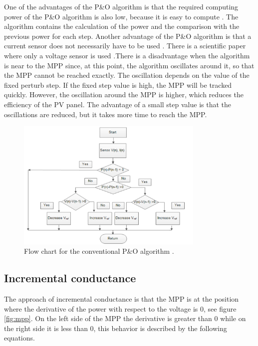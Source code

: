 One of the advantages of the P\&O algorithm is that the required computing power of the P\&O algorithm is also low, because it is easy to compute . The algorithm contains the calculation of the power and the comparison with the previous power for each step. Another advantage of the P\&O algorithm is that a current sensor does not necessarily have to be used  . There is a scientific paper where only a voltage sensor is used \cite{withoutcurrent}.There is a disadvantage when the algorithm is near to the MPP since, at this point, the algorithm oscillates around it, so that the MPP cannot be reached exactly. The oscillation depends on the value of the fixed perturb step. If the fixed step value is high, the MPP will be tracked quickly. However, the oscillation around the MPP is higher, which reduces the efficiency of the PV panel. The advantage of a small step value is that the oscillations are reduced, but it takes more time to reach the MPP. \cite{AN1521_MC}

\begin{figure}[H]
	\begin{center}
		\includegraphics[width=0.8\textwidth]{../Pictures/P1/Flow_chart/flow_chart_perturb_observe}
		\caption{Flow chart for the conventional P\&O algorithm \cite{PerturbObserveFC}.}
		\label{fcperturbandobserve}
	\end{center}	
\end{figure}

\subsection{Incremental conductance}
The approach of incremental conductance is that the MPP is at the position where the derivative of the power with respect to the voltage is 0, see figure \ref{fig:mpp}. On the left side of the MPP the derivative is greater than 0 while on the right side it is less than 0, this behavior is described by the following equations. \cite{AN1521_MC}

